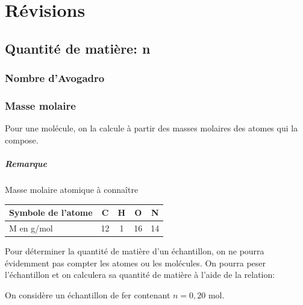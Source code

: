 \setcounter{chapter}{-1}
\chapter{Révisions}
\section{Quantité de matière: n}
	\subsection{Nombre d'Avogadro}


\subsection{Masse molaire}

Pour une molécule, on la calcule à partir des masses molaires des atomes qui la compose.

\paragraph*{Remarque} Masse molaire atomique à connaître

\begin{tabular}{|l||c|c|c|c|}
	\hline
  Symbole de l'atome& C & H & O & N\\
  \hline
  M en g/mol& 12 & 1 & 16 & 14 \\
  \hline
\end{tabular}

Pour déterminer la quantité de matière d'un échantillon, on ne pourra évidemment pas compter les atomes ou les molécules. On pourra peser  l'échantillon et on calculera sa quantité de matière à l'aide de la relation:\\

On considère un échantillon de fer contenant $n=0,20$ mol.

